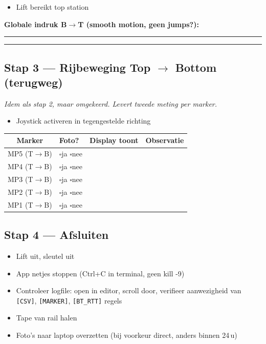 \documentclass[11pt, a4paper]{article}
\newcommand{\cbox}{$\square$\;}
\newcommand{\fillblock}[1]{\rule[-0.5ex]{#1}{0.4pt}}
\begin{document}
\begin{itemize}[leftmargin=2em, label=$\square$]
  \item Lift bereikt top station
\end{itemize}

\textbf{Globale indruk B$\to$T (smooth motion, geen jumps?):}

\fillblock{\textwidth}\hfill\fillblock{\textwidth}

\subsection{Stap 3 — Rijbeweging Top $\to$ Bottom (terugweg)}

\textit{Idem als stap 2, maar omgekeerd. Levert tweede meting per
marker.}

\begin{itemize}[leftmargin=2em, label=$\square$]
  \item Joystick activeren in tegengestelde richting
\end{itemize}

\renewcommand{\arraystretch}{1.9}
\begin{tabular}{@{}|c|p{2cm}|p{3cm}|p{5cm}|@{}}
\hline
\textbf{Marker} & \textbf{Foto?} & \textbf{Display toont} & \textbf{Observatie} \\ \hline
MP5 (T$\to$B) & \cbox ja \cbox nee & & \\ \hline
MP4 (T$\to$B) & \cbox ja \cbox nee & & \\ \hline
MP3 (T$\to$B) & \cbox ja \cbox nee & & \\ \hline
MP2 (T$\to$B) & \cbox ja \cbox nee & & \\ \hline
MP1 (T$\to$B) & \cbox ja \cbox nee & & \\ \hline
\end{tabular}
\renewcommand{\arraystretch}{1.0}

\subsection{Stap 4 — Afsluiten}

\begin{itemize}[leftmargin=2em, label=$\square$]
  \item Lift uit, sleutel uit
  \item App netjes stoppen (Ctrl+C in terminal, geen kill -9)
  \item Controleer logfile: open in editor, scroll door, verifieer aanwezigheid van \texttt{[CSV]}, \texttt{[MARKER]}, \texttt{[BT\_RTT]} regels
  \item Tape van rail halen
  \item Foto's naar laptop overzetten (bij voorkeur direct, anders binnen 24\,u)
\end{itemize}
\end{document}
